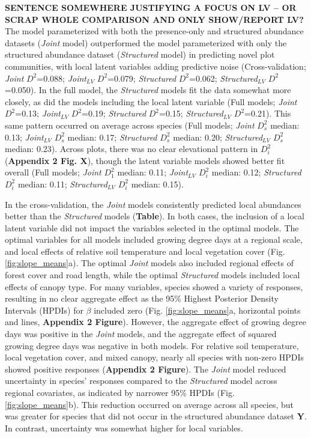 \documentclass[preprint,review,times,12pt]{elsarticle}
\begin{document}
\textbf{SENTENCE SOMEWHERE JUSTIFYING A FOCUS ON LV -- OR SCRAP WHOLE COMPARISON AND ONLY SHOW/REPORT LV?}
The model parameterized with both the presence-only and structured abundance datasets (\emph{Joint} model) outperformed the model parameterized with only the structured abundance dataset (\emph{Structured} model) in predicting novel plot communities, with local latent variables adding predictive noise (Cross-validation; \emph{Joint} $D^2$=0.088; \emph{Joint}$_{LV}$ $D^2$=0.079; \emph{Structured} $D^2$=0.062; \emph{Structured}$_{LV}$ $D^2$=0.050). In the full model, the \emph{Structured} models fit the data somewhat more closely, as did the models including the local latent variable (Full models; \emph{Joint} $D^2$=0.13; \emph{Joint}$_{LV}$ $D^2$=0.19; \emph{Structured} $D^2$=0.15; \emph{Structured}$_{LV}$ $D^2$=0.21). This same pattern occurred on average across species (Full models; \emph{Joint} $D^2_s$ median: 0.13; \emph{Joint}$_{LV}$ $D^2_s$ median: 0.17; \emph{Structured} $D^2_s$ median: 0.20; \emph{Structured}$_{LV}$ $D^2_s$ median: 0.23). Across plots, there was no clear elevational pattern in $D^2_i$ (\textbf{Appendix 2 Fig. X}), though the latent variable models showed better fit overall (Full models; \emph{Joint} $D^2_1$ median: 0.11; \emph{Joint}$_{LV}$ $D^2_i$ median: 0.12; \emph{Structured} $D^2_i$ median: 0.11; \emph{Structured}$_{LV}$ $D^2_i$ median: 0.15).

In the cross-validation, the \emph{Joint} models consistently predicted local abundances better than the \emph{Structured} models (\textbf{Table}). In both cases, the inclusion of a local latent variable did not impact the variables selected in the optimal models. The optimal variables for all models included growing degree days at a regional scale, and local effects of relative soil temperature and local vegetation cover (Fig. \ref{fig:slope_means}a). The optimal \emph{Joint} models also included regional effects of forest cover and road length, while the optimal \emph{Structured} models included local effects of canopy type. For many variables, species showed a variety of responses, resulting in no clear aggregate effect as the 95\% Highest Posterior Density Intervals (HPDIs) for $\beta$ included zero (Fig. \ref{fig:slope_means}a, horizontal points and lines, \textbf{Appendix 2 Figure}). However, the aggregate effect of growing degree days was positive in the \emph{Joint} models, and the aggregate effect of squared growing degree days was negative in both models. For relative soil temperature, local vegetation cover, and mixed canopy, nearly all species with non-zero HPDIs showed positive responses (\textbf{Appendix 2 Figure}). The \emph{Joint} model reduced uncertainty in species' responses compared to the \emph{Structured} model across regional covariates, as indicated by narrower 95\% HPDIs (Fig. \ref{fig:slope_means}b). This reduction occurred on average across all species, but was greater for species that did not occur in the structured abundance dataset \textbf{Y}. In contrast, uncertainty was somewhat higher for local variables.
\end{document}
